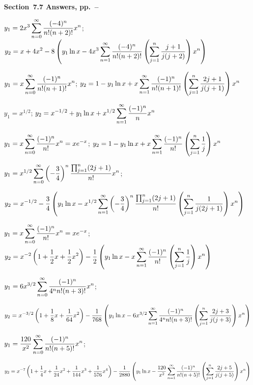 {\bf Section~7.7 Answers,
pp.~\pageref{exer:7.7.1}--\pageref{exer:7.7.48}}\medskip

$\displaystyle{y_{1}=2x^{3}\sum_{n=0}^{\infty}\frac{(-4)^{n}}{n!(n+2)!}x^{n}}$;\;
$\displaystyle{y_{2}=x+4x^{2}-8\left(y_{1}\ln x-4x^{3}\sum_{n=1}^{\infty}\frac{(-4)^{n}}{n!(n+2)!}\left(\sum_{j=1}^{n}\frac{j+1}{j(j+2)}\right)x^{n}\right)}$

$\displaystyle{y_{1}=x\sum_{n=0}^{\infty}\frac{(-1)^{n}}{n!(n+1)!}x^{n}}$;\;
$\displaystyle{y_{2}=1-y_{1}\ln x
+x\sum_{n=1}^{\infty}\frac{(-1)^{n}}{n!(n+1)!}\left(\sum_{j=1}^{n}\frac{2j+1}{j(j+1)}\right)x^{n}}$

$y_{1}=x^{1/2}$;\;   $\displaystyle{y_{2}=x^{-1/2}+y_{1}\ln
x+x^{1/2}\sum_{n=1}^{\infty}\frac{(-1)^{n}}{n}x^{n}}$

$\displaystyle{y_{1}=x\sum_{n=0}^{\infty}\frac{(-1)^{n}}{n!}x^{n}=xe^{-x}}$;\;
$\displaystyle{y_{2}=1-y_{1}\ln x+x\sum_{n=1}^{\infty}\frac{(-1)^{n}}{n!}\left(\sum_{j=1}^{n}\frac{1}{j}\right)x^{n}}$\;

$\displaystyle{y_{1}=x^{1/2}\sum_{n=0}^{\infty}\left(-\frac{3}{4}\right)^{n}\frac{\prod_{j=1}^{n}(2j+1)}{n!}x^{n}}$;\;

\quad\;  \;
$\displaystyle{y_{2}=x^{-1/2}-\frac{3}{4}\left(y_{1}\ln
x-x^{1/2}\sum_{n=1}^{\infty}\left(-\frac{3}{4}\right)^{n}\frac{\prod_{j=1}^{n}(2j+1)}{n!}\left(\sum_{j=1}^{n}\frac{1}{j(2j+1)}\right)x^{n}\right)}$

$\displaystyle{y_{1}=x\sum_{n=0}^{\infty}\frac{(-1)^{n}}{n!}x^{n}=xe^{-x}}$;\;
 $\displaystyle{y_{2}=x^{-2}\left(1+\frac{1}{2}x+\frac{1}{2}x^{2}\right)-\frac{1}{2}
\left(y_{1}\ln x-x\sum_{n=1}^{\infty}\frac{(-1)^{n}}{n!}\left(\sum_{j=1}^{n}\frac{1}{j}\right)x^{n}\right)}$\;

$\displaystyle{y_{1}=6x^{3/2}\sum_{n=0}^{\infty}
\frac{(-1)^{n}}{4^{n}n!(n+3)!}x^{n}}$;\;

\quad\;  \;
$\displaystyle{y_{2}=x^{-3/2}\left(1+\frac{1}{8}x+\frac{1}{64}x^{2}\right)
-\frac{1}{768}\left(y_{1}\ln x-6x^{3/2}\sum_{n=1}^{\infty}
\frac{(-1)^{n}}{4^{n}n!(n+3)!}
\left(\sum_{j=1}^{n}\frac{2j+3}{j(j+3)}\right)x^{n}\right)}$

$\displaystyle{y_{1}=\frac{120}{x^{2}}\sum_{n=0}^{\infty}\frac{(-1)^{n}}{n!(n+5)!}x^{n}}$;\;

\quad\;  \;
$\displaystyle{y_{2}=x^{-7}\left(1+\frac{1}{4}x+\frac{1}{24}x^{2}+\frac{1}{144}x^{3}
+\frac{1}{576}x^{4}\right)-\frac{1}{2880}\left(y_{1}\ln x-\frac{120}{x^{2}}
\sum_{n=1}^{\infty}\frac{(-1)^{n}}{n!(n+5)!}\left(\sum_{j=1}^{n}\frac{2j+5}{j(j+5)}\right)x^{n}\right)}$


